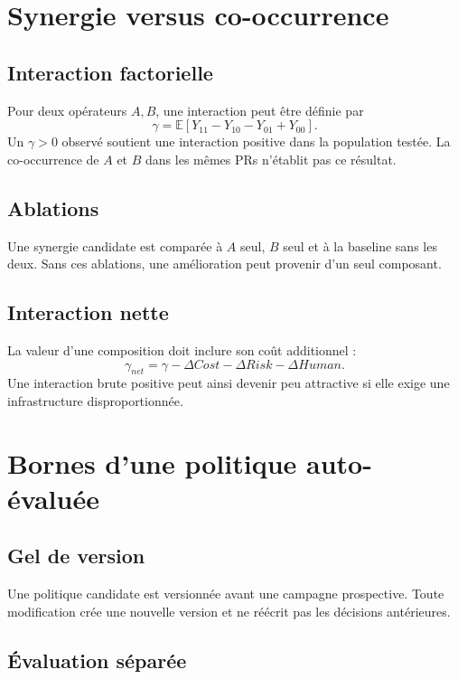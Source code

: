\chapter{Synergie versus co-occurrence}

\section{Interaction factorielle}

Pour deux opérateurs $A,B$, une interaction peut être définie par
\[
\gamma=\mathbb E[Y_{11}-Y_{10}-Y_{01}+Y_{00}].
\]
Un $\gamma>0$ observé soutient une interaction positive dans la population testée. La co-occurrence de $A$ et $B$ dans les mêmes PRs n'établit pas ce résultat.

\section{Ablations}

Une synergie candidate est comparée à $A$ seul, $B$ seul et à la baseline sans les deux. Sans ces ablations, une amélioration peut provenir d'un seul composant.

\section{Interaction nette}

La valeur d'une composition doit inclure son coût additionnel :
\[
\gamma_{net}=\gamma-\Delta Cost-\Delta Risk-\Delta Human.
\]
Une interaction brute positive peut ainsi devenir peu attractive si elle exige une infrastructure disproportionnée.

\chapter{Bornes d'une politique auto-évaluée}

\section{Gel de version}

Une politique candidate est versionnée avant une campagne prospective. Toute modification crée une nouvelle version et ne réécrit pas les décisions antérieures.

\section{Évaluation séparée}

